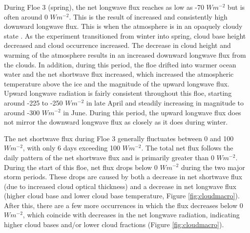During Floe 3 (spring), the net longwave flux reaches as low as -70 $Wm^{-2}$ but is often around 0 $Wm^{-2}$. This is the result of increased and consistently high downward longwave flux. This is when the atmosphere is in an opaquely cloudy state \citep{stramler:2011, graham:2017}. As the experiment transitioned from winter into spring, cloud base height decreased and cloud occurrence increased. The decrease in cloud height and warming of the atmosphere results in an increased downward longwave flux from the clouds. In addition, during this period, the floe drifted into warmer ocean water \citep{kayser:2017} and the net shortwave flux increased, which increased the atmospheric temperature above the ice and the magnitude of the upward longwave flux. Upward longwave radiation is fairly consistent throughout this floe, starting around -225 to -250 $Wm^{-2}$ in late April and steadily increasing in magnitude to around -300 $Wm^{-2}$ in June. During this period, the upward longwave flux does not mirror the downward longwave flux as closely as it does during winter.

The net shortwave flux during Floe 3 generally fluctuates between 0 and 100 $Wm^{-2}$, with only 6 days exceeding 100 $Wm^{-2}$. The total net flux follows the daily pattern of the net shortwave flux and is primarily greater than 0 $Wm^{-2}$. During the start of this floe, net flux drops below 0 $Wm^{-2}$ during the two major storm periods. These drops are caused by both a decrease in net shortwave flux (due to increased cloud optical thickness) and a decrease in net longwave flux (higher cloud base and lower cloud base temperature, Figure \ref{fig:cloudmacro}). After this, there are a few more occurrences in which the flux decreases below 0 $Wm^{-2}$, which coincide with decreases in the net longwave radiation, indicating higher cloud bases and/or lower cloud fractions (Figure \ref{fig:cloudmacro}).  

